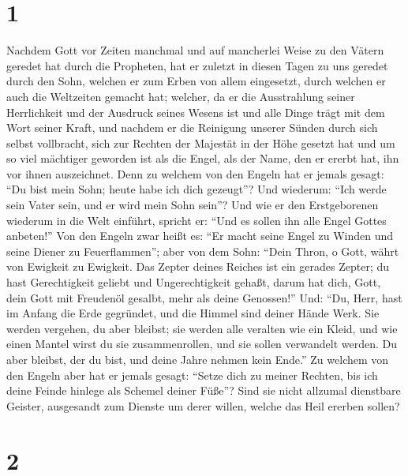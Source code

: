 \hypertarget{section}{%
\section{1}\label{section}}

 Nachdem Gott vor Zeiten manchmal und auf mancherlei Weise
zu den Vätern geredet hat durch die Propheten, hat er zuletzt in diesen
Tagen zu uns geredet durch den Sohn,  welchen er zum Erben
von allem eingesetzt, durch welchen er auch die Weltzeiten gemacht hat;
 welcher, da er die Ausstrahlung seiner Herrlichkeit und
der Ausdruck seines Wesens ist und alle Dinge trägt mit dem Wort seiner
Kraft, und nachdem er die Reinigung unserer Sünden durch sich selbst
vollbracht, sich zur Rechten der Majestät in der Höhe gesetzt hat
 und um so viel mächtiger geworden ist als die Engel, als
der Name, den er ererbt hat, ihn vor ihnen auszeichnet. 
Denn zu welchem von den Engeln hat er jemals gesagt: ``Du bist mein
Sohn; heute habe ich dich gezeugt''? Und wiederum: ``Ich werde sein
Vater sein, und er wird mein Sohn sein''?  Und wie er den
Erstgeborenen wiederum in die Welt einführt, spricht er: ``Und es sollen
ihn alle Engel Gottes anbeten!''  Von den Engeln zwar
heißt es: ``Er macht seine Engel zu Winden und seine Diener zu
Feuerflammen'';  aber von dem Sohn: ``Dein Thron, o Gott,
währt von Ewigkeit zu Ewigkeit. Das Zepter deines Reiches ist ein
gerades Zepter;  du hast Gerechtigkeit geliebt und
Ungerechtigkeit gehaßt, darum hat dich, Gott, dein Gott mit Freudenöl
gesalbt, mehr als deine Genossen!''  Und: ``Du, Herr,
hast im Anfang die Erde gegründet, und die Himmel sind deiner Hände
Werk.  Sie werden vergehen, du aber bleibst; sie werden
alle veralten wie ein Kleid,  und wie einen Mantel wirst
du sie zusammenrollen, und sie sollen verwandelt werden. Du aber
bleibst, der du bist, und deine Jahre nehmen kein Ende.''
 Zu welchem von den Engeln aber hat er jemals gesagt:
``Setze dich zu meiner Rechten, bis ich deine Feinde hinlege als Schemel
deiner Füße''?  Sind sie nicht allzumal dienstbare
Geister, ausgesandt zum Dienste um derer willen, welche das Heil ererben
sollen?

\hypertarget{section-1}{%
\section{2}\label{section-1}}

